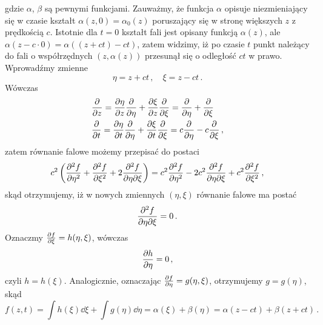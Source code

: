 \documentclass[../main.tex]{subfiles}
\begin{document}
      gdzie \(\alpha\), \(\beta\) są pewnymi funkcjami. Zauważmy, że funkcja \(\alpha\) opisuje niezmieniający się w czasie kształt \(\alpha(z,0)=\alpha_0(z)\) poruszający się w stronę większych \(z\) z prędkością \(c\). Istotnie dla \(t=0\) kształt fali jest opisany funkcją \(\alpha(z)\), ale \(\alpha(z-c\cdot 0)=\alpha((z+ct)-ct)\), zatem widzimy, iż po czasie \(t\) punkt należący do fali o współrzędnych \((z,\alpha(z))\) przesunął się o odległość \(ct\) w prawo. Wprowadźmy zmienne
      \begin{equation*}
          \eta=z+ct\,,\quad \xi=z-ct\,.
      \end{equation*}
      Wówczas
      \begin{equation*}
      \begin{split}
          &\pdv{}{z}=\pdv{\eta}{z}\pdv{}{\eta}+\pdv{\xi}{z}\pdv{}{\xi}=\pdv{}{\eta}+\pdv{}{\xi}\\
          &\pdv{}{t}=\pdv{\eta}{t}\pdv{}{\eta}+\pdv{\xi}{t}\pdv{}{\xi}=c\pdv{}{\eta}-c\pdv{}{\xi}\,,
      \end{split}
      \end{equation*}
        zatem równanie falowe możemy przepisać do postaci
        \begin{equation*}
            c^2\left(\pdv[2]{f}{\eta}+\pdv[2]{f}{\xi}+2\pdv[2]{f}{\eta}{\xi}\right)=c^2\pdv[2]{f}{\eta}-2c^2\pdv[2]{f}{\eta}{\xi}+c^2\pdv[2]{f}{\xi}\,,
        \end{equation*}
        skąd otrzymujemy, iż w nowych zmiennych \((\eta,\xi)\) równanie falowe ma postać
        \begin{equation*}
            \pdv[2]{f}{\eta}{\xi}=0\,.
        \end{equation*}
        Oznaczmy \(\pdv{f}{\xi}=h(\eta,\xi)\), wówczas
        \begin{equation*}
            \pdv{h}{\eta}=0\,,
        \end{equation*}
        czyli \(h=h(\xi)\). Analogicznie, oznaczając \(\pdv{f}{\eta}=g(\eta,\xi)\), otrzymujemy \(g=g(\eta)\), skąd
        \begin{equation*}
            f(z,t)=\int h(\xi)\dd{\xi}+\int g(\eta)\dd{\eta}=\alpha(\xi)+\beta(\eta)=\alpha(z-ct)+\beta(z+ct)\,.
        \end{equation*}
\end{document}
